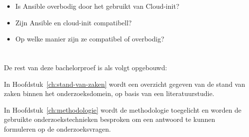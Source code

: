 \begin{itemize}
    \item Is Ansible overbodig door het gebruikt van Cloud-init?
    \item Zijn Ansible en cloud-init compatibell?
    \item Op welke manier zijn ze compatibel of overbodig?
\end{itemize}





\section{}
\label{sec:opzet-bachelorproef}


De rest van deze bachelorproef is als volgt opgebouwd:

In Hoofdstuk~\ref{ch:stand-van-zaken} wordt een overzicht gegeven van de stand van zaken binnen het onderzoeksdomein, op basis van een literatuurstudie.

In Hoofdstuk~\ref{ch:methodologie} wordt de methodologie toegelicht en worden de gebruikte onderzoekstechnieken besproken om een antwoord te kunnen formuleren op de onderzoeksvragen.

